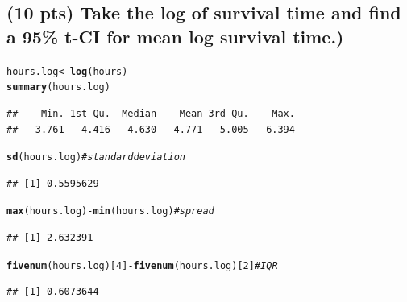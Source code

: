 \documentclass{article}\usepackage[]{graphicx}\usepackage[]{color}
\makeatletter
\newcommand{\hlnum}[1]{\textcolor[rgb]{0.686,0.059,0.569}{#1}}%
\newcommand{\hlcom}[1]{\textcolor[rgb]{0.678,0.584,0.686}{\textit{#1}}}%
\newcommand{\hlopt}[1]{\textcolor[rgb]{0,0,0}{#1}}%
\newcommand{\hlstd}[1]{\textcolor[rgb]{0.345,0.345,0.345}{#1}}%
\newcommand{\hlkwb}[1]{\textcolor[rgb]{0.69,0.353,0.396}{#1}}%
\newcommand{\hlkwd}[1]{\textcolor[rgb]{0.737,0.353,0.396}{\textbf{#1}}}%
\newenvironment{kframe}{%
 \def\at@end@of@kframe{}%
 \ifinner\ifhmode%
  \def\at@end@of@kframe{\end{minipage}}%
  \begin{minipage}{\columnwidth}%
 \fi\fi%
 \def\FrameCommand##1{\hskip\@totalleftmargin \hskip-\fboxsep
 \colorbox{shadecolor}{##1}\hskip-\fboxsep
     \hskip-\linewidth \hskip-\@totalleftmargin \hskip\columnwidth}%
 \MakeFramed {\advance\hsize-\width
   \@totalleftmargin\z@ \linewidth\hsize
   \@setminipage}}%
 {\par\unskip\endMakeFramed%
 \at@end@of@kframe}
\newenvironment{knitrout}{}{} %
\makeatother
\begin{document}
\subsection{(10 pts) Take the log of survival time and find a 95\% t-CI for mean log survival time.)}
\begin{knitrout}
\color{fgcolor}\begin{kframe}
\begin{alltt}
\hlstd{hours.log} \hlkwb{<-} \hlkwd{log}\hlstd{(hours)}
\hlkwd{summary}\hlstd{(hours.log)}
\end{alltt}
\begin{verbatim}
##    Min. 1st Qu.  Median    Mean 3rd Qu.    Max. 
##   3.761   4.416   4.630   4.771   5.005   6.394
\end{verbatim}
\begin{alltt}
\hlkwd{sd}\hlstd{(hours.log)} \hlcom{# standard deviation}
\end{alltt}
\begin{verbatim}
## [1] 0.5595629
\end{verbatim}
\begin{alltt}
\hlkwd{max}\hlstd{(hours.log)} \hlopt{-} \hlkwd{min}\hlstd{(hours.log)} \hlcom{#spread}
\end{alltt}
\begin{verbatim}
## [1] 2.632391
\end{verbatim}
\begin{alltt}
\hlkwd{fivenum}\hlstd{(hours.log)[}\hlnum{4}\hlstd{]} \hlopt{-} \hlkwd{fivenum}\hlstd{(hours.log)[}\hlnum{2}\hlstd{]} \hlcom{#IQR}
\end{alltt}
\begin{verbatim}
## [1] 0.6073644
\end{verbatim}
\end{kframe}
\end{knitrout}
\end{document}
